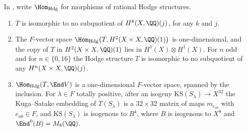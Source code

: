 \begin{proposition}\label{prop:mumfordwhere}
In , write $\Hom_{\mathrm{Hdg}}$ for morphisms of rational
Hodge structures.
\begin{enumerate}[label=\textup{(\roman*)},nosep,leftmargin=2.6em]
\item $T$ is isomorphic to no subquotient of $H^{k}(X,\QQ)(j)$, for any $k$
  and $j$.
\item The $F$-vector space
  $\Hom_{\mathrm{Hdg}}\bigl(T,H^{2}(X\times X,\QQ)(1)\bigr)$ is
  one-dimensional, and the copy of $T$ in $H^{2}(X\times X,\QQ)(1)$ lies in
  $H^{1}(X)\otimes H^{1}(X)$. For $n$ odd and for $n\in\{0,16\}$ the Hodge
  structure $T$ is isomorphic to no subquotient of any
  $H^{n}(X\times X,\QQ)(j)$.
\item $\Hom_{\mathrm{Hdg}}(T,\End V)$ is a one-dimensional $F$-vector space,
  spanned by the inclusion. For $\lambda\in F$ totally positive, after an
  isogeny $\mathrm{KS}(S_{\lambda})\to X^{32}$ the Kuga--Satake embedding of
  $T(S_{\lambda})$ is a $32\times32$ matrix of maps $m_{e_{ab}}$ with
  $e_{ab}\in F$, and $\mathrm{KS}(S_{\lambda})$ is isogenous to $B^{4}$, where
  $B$ is isogenous to $X^{8}$ and $\End^{0}(B)=M_{8}(\QQ)$.
\end{enumerate}
\end{proposition}

